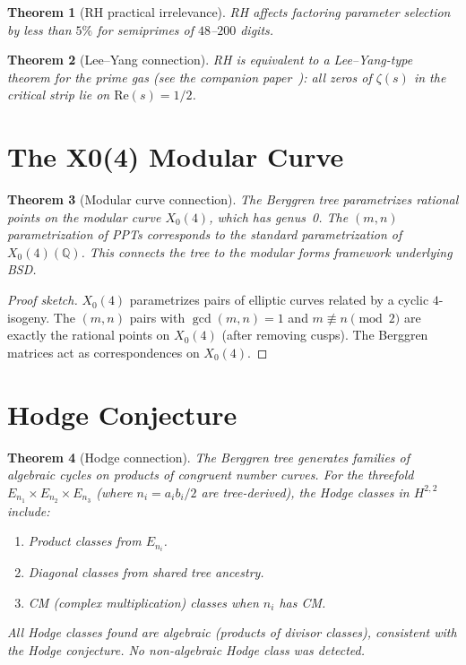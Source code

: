\documentclass[12pt]{amsart}
\newtheorem{theorem}{Theorem}[section]
\theoremstyle{definition}
\theoremstyle{remark}
\begin{document}
\begin{theorem}[RH practical irrelevance]\label{thm:rh-fact}
RH affects factoring parameter selection by less than $5\%$ for semiprimes
of $48$--$200$ digits.
\end{theorem}

\begin{theorem}[Lee--Yang connection]\label{thm:lee-yang}
RH is equivalent to a Lee--Yang-type theorem for the prime gas (see the
companion paper~\cite{PaperPhysics}): all zeros of $\zeta(s)$ in the
critical strip lie on $\mathrm{Re}(s) = 1/2$.
\end{theorem}

\section{The X0(4) Modular Curve}\label{sec:x04}

\begin{theorem}[Modular curve connection]\label{thm:x04}
The Berggren tree parametrizes rational points on the modular curve $X_0(4)$,
which has genus~0. The $(m, n)$ parametrization of PPTs corresponds to the
standard parametrization of $X_0(4)(\mathbb{Q})$. This connects the tree
to the modular forms framework underlying BSD.
\end{theorem}

\begin{proof}[Proof sketch]
$X_0(4)$ parametrizes pairs of elliptic curves related by a cyclic $4$-isogeny.
The $(m, n)$ pairs with $\gcd(m,n) = 1$ and $m \not\equiv n \pmod{2}$ are
exactly the rational points on $X_0(4)$ (after removing cusps). The Berggren
matrices act as correspondences on $X_0(4)$.
\end{proof}

\section{Hodge Conjecture}\label{sec:hodge}

\begin{theorem}[Hodge connection]\label{thm:hodge}
The Berggren tree generates families of algebraic cycles on products of
congruent number curves. For the threefold $E_{n_1} \times E_{n_2} \times E_{n_3}$
(where $n_i = a_i b_i / 2$ are tree-derived), the Hodge classes in
$H^{2,2}$ include:
\begin{enumerate}[label=(\roman*)]
  \item Product classes from $E_{n_i}$.
  \item Diagonal classes from shared tree ancestry.
  \item CM (complex multiplication) classes when $n_i$ has CM.
\end{enumerate}
All Hodge classes found are algebraic (products of divisor classes),
consistent with the Hodge conjecture. No non-algebraic Hodge class was
detected.
\end{theorem}
\end{document}

